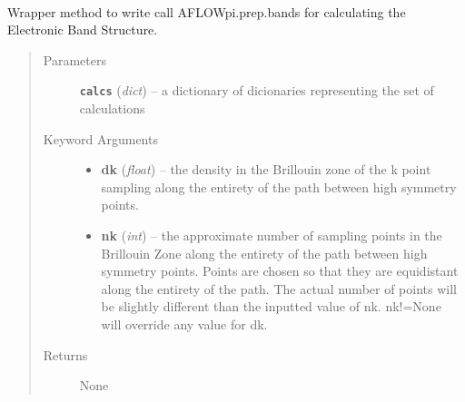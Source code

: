 \documentclass[letterpaper,10pt,english]{sphinxmanual}
\begin{document}

\begin{fulllineitems}
\label{prep:prep.calcs_container}~

\begin{fulllineitems}
\label{prep:prep.calcs_container.addToAll}
\end{fulllineitems}


\begin{fulllineitems}
\label{prep:prep.calcs_container.bands}
Wrapper method to write call AFLOWpi.prep.bands for calculating the Electronic Band
Structure.
\begin{quote}\begin{description}
\item[{Parameters}] \leavevmode
\textbf{\texttt{calcs}} (\emph{dict}) -- a dictionary of dicionaries representing the set of calculations

\item[{Keyword Arguments}] \leavevmode\begin{itemize}
\item {} 
\textbf{dk} (\emph{float}) --
the density in the Brillouin zone of the k point sampling along the
entirety of the path between high symmetry points.

\item {} 
\textbf{nk} (\emph{int}) --
the approximate number of sampling points  in the Brillouin Zone along
the entirety of the path between high symmetry points. Points are
chosen so that they are equidistant along the entirety of the path.
The actual number of points will be slightly different than the
inputted value of nk. nk!=None will override any value for dk.

\end{itemize}

\item[{Returns}] \leavevmode
None

\end{description}\end{quote}

\end{fulllineitems}


\end{fulllineitems}
\end{document}
